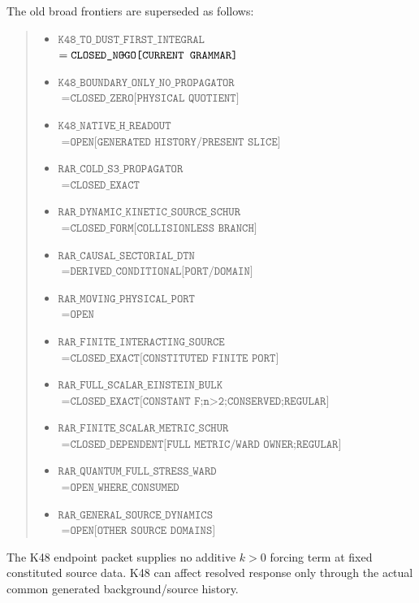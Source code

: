 \documentclass[12pt,a4paper]{article}
\begin{document}
\begin{remark}
\label{p8:rem:v2145-k48-rar-frontier}
The old broad frontiers are superseded as follows:
\begin{quote}
\small
\begin{itemize}
\setlength{\itemsep}{2pt}
\item[] \( \texttt{K48\_TO\_DUST\_FIRST\_INTEGRAL} \)\\
\( =\texttt{CLOSED\_NO\!\!-\!GO[CURRENT\ GRAMMAR]} \)
\item[] \( \texttt{K48\_BOUNDARY\_ONLY\_N0\_PROPAGATOR} \)\\
\( =\texttt{CLOSED\_ZERO[PHYSICAL\ QUOTIENT]} \)
\item[] \( \texttt{K48\_NATIVE\_H\_READOUT} \)\\
\( =\texttt{OPEN[GENERATED\ HISTORY/PRESENT\ SLICE]} \)
\item[] \( \texttt{RAR\_COLD\_S3\_PROPAGATOR} \)\\
\( =\texttt{CLOSED\_EXACT} \)
\item[] \( \texttt{RAR\_DYNAMIC\_KINETIC\_SOURCE\_SCHUR} \)\\
\( =\texttt{CLOSED\_FORM[COLLISIONLESS\ BRANCH]} \)
\item[] \( \texttt{RAR\_CAUSAL\_SECTORIAL\_DTN} \)\\
\( =\texttt{DERIVED\_CONDITIONAL[PORT/DOMAIN]} \)
\item[] \( \texttt{RAR\_MOVING\_PHYSICAL\_PORT} \)\\
\( =\texttt{OPEN} \)
\item[] \( \texttt{RAR\_FINITE\_INTERACTING\_SOURCE} \)\\
\( =\texttt{CLOSED\_EXACT[CONSTITUTED\ FINITE\ PORT]} \)
\item[] \( \texttt{RAR\_FULL\_SCALAR\_EINSTEIN\_BULK} \)\\
\( =\texttt{CLOSED\_EXACT[CONSTANT\ F;n>2;CONSERVED;REGULAR]} \)
\item[] \( \texttt{RAR\_FINITE\_SCALAR\_METRIC\_SCHUR} \)\\
\( =\texttt{CLOSED\_DEPENDENT[FULL\ METRIC/WARD\ OWNER;REGULAR]} \)
\item[] \( \texttt{RAR\_QUANTUM\_FULL\_STRESS\_WARD} \)\\
\( =\texttt{OPEN\_WHERE\_CONSUMED} \)
\item[] \( \texttt{RAR\_GENERAL\_SOURCE\_DYNAMICS} \)\\
\( =\texttt{OPEN[OTHER\ SOURCE\ DOMAINS]} \)
\end{itemize}
\end{quote}
The K48 endpoint packet supplies no additive $k>0$ forcing term at fixed
constituted source data.  K48 can affect resolved response only through the
actual common generated background/source history.
\end{remark}
\end{document}
